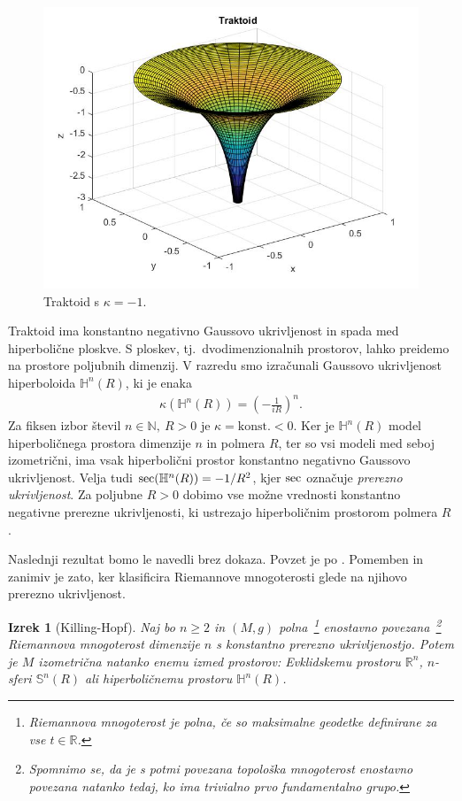 \documentclass[a4paper]{article}
\newtheorem{izrek}{Izrek}
\begin{document}
\begin{figure}[h!]
\begin{center}
\includegraphics[scale=0.35]{traktoid.jpg}
\caption{Traktoid s $\kappa = -1$.}
\end{center}
\end{figure}
%
Traktoid ima konstantno negativno Gaussovo ukrivljenost in spada med hiperbolične ploskve. S ploskev, tj.~dvodimenzionalnih prostorov, lahko preidemo na prostore poljubnih dimenzij. V razredu smo izračunali Gaussovo ukrivljenost hiperboloida $\mathbb{H}^{n}(R)$, ki je enaka 
\begin{gather}
\kappa (\mathbb{H}^{n}(R)) = \left(-\frac{1}{iR} \right)^n.
\end{gather}
 Za fiksen izbor števil $n \in \mathbb{N}, \ R>0$ je $\kappa = \mbox{konst.}<0$. Ker je $\mathbb{H}^{n}(R)$ model hiperboličnega prostora dimenzije $n$ in polmera $R$, ter so vsi modeli med seboj izometrični, ima vsak hiperbolični prostor konstantno negativno Gaussovo ukrivljenost. Velja tudi $\textup{sec}(\mathbb{H}^{n}(R)) = -1/R^2$, kjer $\textup{sec}$ označuje \emph{prerezno ukrivljenost}. Za poljubne $R>0$ dobimo vse možne vrednosti konstantno negativne prerezne ukrivljenosti, ki ustrezajo hiperboličnim prostorom polmera $R$.

Naslednji rezultat bomo le navedli brez dokaza. Povzet je po \cite[Theorem 12.4 (Killing-Hopf)]{leeRM}. Pomemben in zanimiv je zato, ker klasificira Riemannove mnogoterosti glede na njihovo prerezno ukrivljenost.

\begin{izrek}[Killing-Hopf]
Naj bo $n \geq 2$ in $(M,g)$ polna~\footnote{Riemannova mnogoterost je \emph{polna}, če so maksimalne geodetke definirane za vse $t \in \mathbb{R}$.} enostavno povezana~\footnote{Spomnimo se, da je s potmi povezana topološka mnogoterost \emph{enostavno povezana} natanko tedaj, ko ima trivialno prvo fundamentalno grupo.} 
Riemannova mnogoterost dimenzije $n$ s konstantno prerezno ukrivljenostjo. Potem je $M$ izometrična natanko enemu izmed prostorov: Evklidskemu prostoru $\mathbb{R}^{n}$, $n$-sferi $\mathbb{S}^{n}(R)$ ali hiperboličnemu prostoru $\mathbb{H}^{n}(R)$.
\end{izrek}
\end{document}
